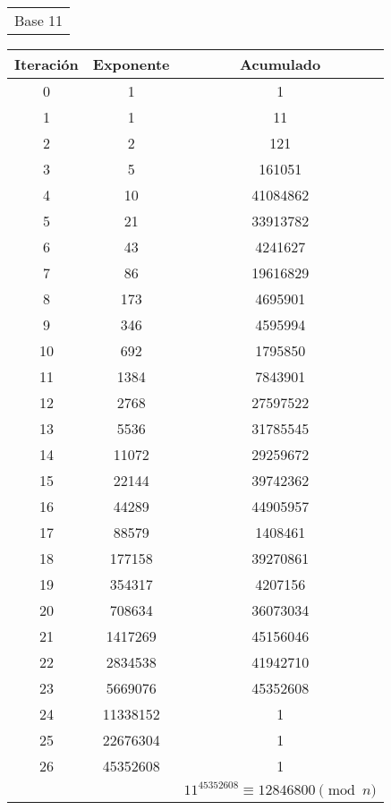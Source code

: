 \documentclass[fleqn]{article}
\begin{document}
\begin{center}
        \begin{tabular}{c}
            Base 11 \\
        \end{tabular}
        \begin{tabular}{c | c | c}
            Iteración & Exponente & Acumulado \\ \hline
            0 & 1 & 1 \\
            1 & 1 & 11 \\
            2 & 2 & 121 \\
            3 & 5 & 161051 \\
            4 & 10 & 41084862 \\
            5 & 21 & 33913782 \\
            6 & 43 & 4241627 \\
            7 & 86 & 19616829 \\
            8 & 173 & 4695901 \\
            9 & 346 & 4595994 \\
            10 & 692 & 1795850 \\
            11 & 1384 & 7843901 \\
            12 & 2768 & 27597522 \\
            13 & 5536 & 31785545 \\
            14 & 11072 & 29259672 \\
            15 & 22144 & 39742362 \\
            16 & 44289 & 44905957 \\
            17 & 88579 & 1408461 \\
            18 & 177158 & 39270861 \\
            19 & 354317 & 4207156 \\
            20 & 708634 & 36073034 \\
            21 & 1417269 & 45156046 \\
            22 & 2834538 & 41942710 \\
            23 & 5669076 & 45352608 \\
            24 & 11338152 & 1 \\
            25 & 22676304 & 1 \\
            26 & 45352608 & 1 \\ \hline
            && $ 11^{45352608} \equiv  12846800 \pmod{n} $
        \end{tabular}\\
    \end{center}
\end{document}
